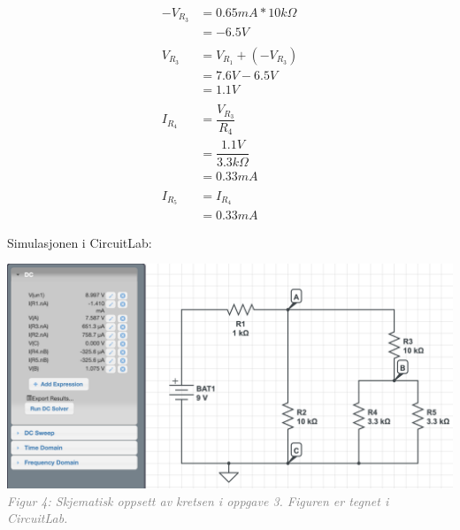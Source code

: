 \documentclass{article}
\begin{document}
                    \begin{equation*}
                        \begin{split}
                            -V_{R_3} &= 0.65mA * 10k\Omega \\
                                &= -6.5V \\
                                \\
                            V_{R_3} &= V_{R_1} + (-V_{R_3}) \\
                                &= 7.6V - 6.5V \\
                                &= 1.1V \\
                                \\
                            I_{R_4} &= \dfrac{V_{R_3}}{R_4} \\
                                &= \dfrac{1.1V}{3.3k\Omega} \\
                                &= 0.33mA \\
                                \\
                            I_{R_5} &= I_{R_4} \\
                                &= 0.33mA
                         \end{split}
                    \end{equation*}

                \pagebreak
                Simulasjonen i CircuitLab:
                \begin{center}
                    \includegraphics[scale=0.4]{vedlegg/3.png}\linebreak
                    \textit{\textcolor{gray}{Figur 4: Skjematisk oppsett av kretsen i oppgave 3. Figuren er tegnet i CircuitLab.}}
                \end{center}
            
\end{document}
